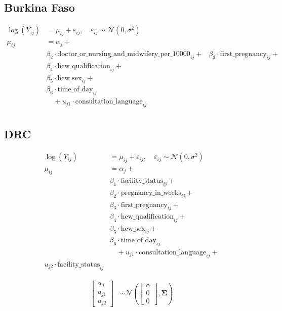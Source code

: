 \documentclass{article}
\begin{document}
\subsection{Burkina Faso}

\begin{align*}
  \log(Y_{ij}) &= \mu_{ij} + \varepsilon_{ij}, \quad \varepsilon_{ij} \sim \mathcal{N}(0, \sigma^2) \\
  \mu_{ij} &= \alpha_j + \\
  & \beta_2 \cdot \text{doctor\_or\_nursing\_and\_midwifery\_per\_10000}_{ij} +
  & \beta_3 \cdot \text{first\_pregnancy}_{ij} + \\
  & \beta_4 \cdot \text{hcw\_qualification}_{ij} + \\
  & \beta_5 \cdot \text{hcw\_sex}_{ij} + \\ 
  & \beta_6 \cdot \text{time\_of\_day}_{ij} \\
  &\quad + u_{j1} \cdot \text{consultation\_language}_{ij} \\
\end{align*}


\subsection{DRC}
\begin{align*}
  \log(Y_{ij}) &= \mu_{ij} + \varepsilon_{ij}, \quad \varepsilon_{ij} \sim \mathcal{N}(0, \sigma^2) \\
  \mu_{ij} &= \alpha_j + \\
  & \beta_1 \cdot \text{facility\_status}_{ij} + \\
  & \beta_2 \cdot \text{pregnancy\_in\_weeks}_{ij} + \\
  & \beta_3 \cdot \text{first\_pregnancy}_{ij} + \\
  & \beta_4 \cdot \text{hcw\_qualification}_{ij} + \\
  & \beta_5 \cdot \text{hcw\_sex}_{ij} + \\ 
  & \beta_6 \cdot \text{time\_of\_day}_{ij} \\
  &\quad + u_{j1} \cdot \text{consultation\_language}_{ij} + \\
  u_{j2} \cdot \text{facility\_status}_{ij}
\end{align*}



\begin{align*}
  \begin{bmatrix}
    \alpha_j \\
    u_{j1} \\
    u_{j2}
  \end{bmatrix}
  &\sim \mathcal{N}
  \left(
  \begin{bmatrix}
    \alpha \\
    0 \\
    0
  \end{bmatrix},
  \boldsymbol{\Sigma}
  \right)
\end{align*}
\end{document}
